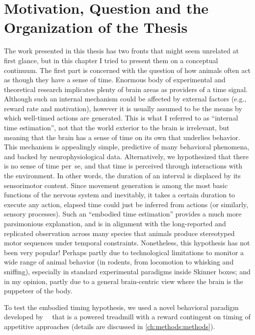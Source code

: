 \section[Motivation, Question and More]{Motivation, Question and the Organization of the Thesis}
\label{intro:question}

The work presented in this thesis has two fronts that might seem unrelated at first glance, but in this chapter I tried to present them on a conceptual continuum.
The first part is concerned with the question of how animals often act as though they have a sense of time.
Enormous body of experimental and theoretical research implicates plenty of brain areas as providers of a time signal.
Although such an internal mechanism could be affected by external factors (e.g., reward rate and motivation), however it is usually assumed to be the means by which well-timed actions are generated.
This is what I referred to as ``internal time estimation'', not that the world exterior to the brain is irrelevant, but meaning that the brain has a sense of time on its own that underlies behavior.
This mechanism is appealingly simple, predictive of many behavioral phenomena, and backed by neurophysiological data.
Alternatively, we hypothesized that there is no sense of time per~se, and that time is perceived through interactions with the environment.
In other words, the duration of an interval is displaced by its sensorimotor content.
Since movement generation is among the most basic functions of the nervous system and inevitably, it takes a certain duration to execute any action, elapsed time could just be inferred from actions (or similarly, sensory processes).
Such an ``embodied time estimation'' provides a much more parsimonious explanation, and is in alignment with the long-reported and replicated observation across many species that animals produce stereotyped motor sequences under temporal constraints.
Nonetheless, this hypothesis has not been very popular!
Perhaps partly due to technological limitations to monitor a wide range of animal behavior (in rodents, from locomotion to whisking and sniffing), especially in standard experimental paradigms inside Skinner boxes; and in my opinion, partly due to a general brain-centric view where the brain is the puppeteer of the body.
\par
To test the embodied timing hypothesis, we used a novel behavioral paradigm developed by~\citeauthor{Rueda2015NN}~\cite{Rueda2015NN} that is a powered treadmill with a reward contingent on timing of appetitive approaches (details are discussed in \autoref{ch:methods:methods}).
